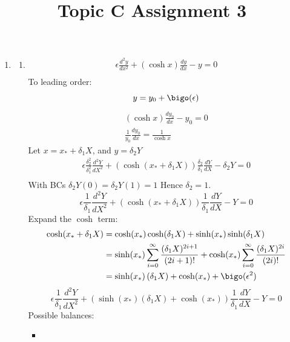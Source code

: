 \documentclass{/home/janmebows/Documents/LatexTemplates/myassignment}
\title{Topic C Assignment 3}
\begin{document}
\maketitle
\begin{enumerate}
	\item \begin{enumerate}
		\item 
		\begin{align*}
			\epsilon \frac{d^2y}{dx^2} + (\cosh x) \frac{dy}{dx} - y= 0\\
		\end{align*}
		To leading order:
		\[y = y_0 + \bigo(\epsilon)\]
		\begin{align*}
			(\cosh x)\frac{dy_0}{dx} - y_0 = 0\\
			\frac{1}{y_0}\frac{dy_0}{dx} = \frac{1}{\cosh x} 
		\end{align*}
		Let $x = x_* + \delta_1 X$, and $y = \delta_2 Y$
		\begin{align*}
			\epsilon \frac{\delta_2^2}{\delta_1^2}\frac{d^2Y}{dX^2} + (\cosh(x_* + \delta_1 X))\frac{\delta_2}{\delta_1} \frac{dY}{dX} - \delta_2 Y= 0\\
		\end{align*}
		With BCs $\delta_2 Y(0) = \delta_2 Y(1) = 1$ Hence $\delta_2 = 1$.
		\[\epsilon \frac{1}{\delta_1}\frac{d^2Y}{dX^2} + (\cosh(x_* + \delta_1 X))\frac1{\delta_1} \frac{dY}{dX} - Y= 0\]
		Expand the $\cosh$ term:
		\begin{align*}
			\cosh (x_*+\delta_1 X) &= \cosh(x_*)\cosh(\delta_1X) + \sinh(x_*)\sinh(\delta_1X)\\
			&=\sinh(x_*)\sum_{i=0}^\infty \frac{(\delta_1 X)^{2i+1}}{(2i+1)!}   + \cosh(x_*)\sum_{i=0}^\infty \frac{(\delta_1 X)^{2i}}{(2i)!}\\
			&= \sinh(x_*)\left(\delta_1 X\right) + \cosh(x_*) + \bigo(\epsilon^2) 
		\end{align*}
		\[\epsilon \frac{1}{\delta_1}\frac{d^2Y}{dX^2} + (\sinh(x_*)\left(\delta_1 X\right) + \cosh(x_*))\frac1{\delta_1} \frac{dY}{dX} - Y= 0\]
		Possible balances:
		\begin{itemize}
			\item 
			\[\]
		\end{itemize}


\end{enumerate}
\end{enumerate}
\end{document}
